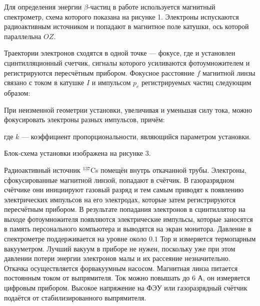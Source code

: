 Для определения энергии $ \beta $-частиц в работе используется магнитный
спектрометр, схема которого показана на рисунке 1. Электроны испускаются радиоактивным
источником и попадают в магнитное поле катушки, ось которой параллельна $ OZ $.


Траектории электронов сходятся в одной точке --- фокусе, где и установлен
сцинтилляционный счетчик, сигналы которого усиливаются фотоумножителем и
регистрируются пересчётным прибором. Фокусное расстояние $ f $ магнитной линзы
связано с током в катушке $ I $ и импульсом $ p_e $ регистрируемых частиц следующим
образом:


При неизменной геометрии установки, увеличивая и уменьшая силу тока, можно
фокусировать электроны разных импульсов, причём:


где $ k $ --- коэффициент пропорциональности, являющийся параметром установки.

Блок-схема установки изображена на рисунке 3.


Радиоактивный источник $ ^{137} $Cs помещён внутрь откачанной трубы.
Электроны, сфокусированные магнитной линзой, попадают в счётчик.
В газоразрядном счётчике они инициируют газовый разряд и тем самым приводят к
появлению электрических импульсов на его электродах, которые затем регистрируются
пересчётным прибором. В результате попадания электронов в сцинтиллятор на выходе
фотоумножителя появляются электрические импульсы, которые заносятся в память
персонального компьютера и выводятся на экран монитора. Давление в спектрометре
поддерживается на уровне около $ 0.1 $ Тор и измеряется термопарным вакууметром.
Лучший вакуум в приборе не нужен, поскольку уже при этом давлении потери энергии
электронов малы и их рассеяние незначительно. Откачка осуществляется форвакуумным
насосом. Магнитная линза питается постоянным током от выпрямителя. Ток можно
повышать до $ 6 $ А, он измеряется цифровым прибором. Высокое напряжение на ФЭУ
или газоразрядный счётчик подаётся от стабилизированного выпрямителя.

